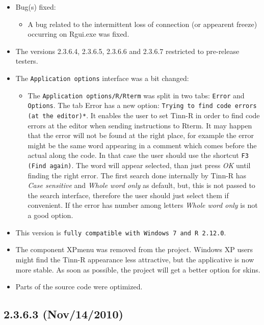 \begin{itemize}
  \item Bug(s) fixed:
    \begin{itemize}
      \item A bug related to the intermittent loss of connection (or appearent freeze) occurring on Rgui.exe was fixed.
    \end{itemize}
  \item The versions 2.3.6.4, 2.3.6.5, 2.3.6.6 and 2.3.6.7 restricted to pre-release testers.
  \item The \texttt{Application options} interface was a bit changed:
    \begin{itemize}
      \item The \texttt{Application options/R/Rterm} was split in two tabs: \texttt{Error} and \texttt{Options}.
        The tab Error has a new option: \texttt{Trying to find code errors (at the editor)*}.
        It enables the user to set Tinn-R in order to find code errors at the editor when sending instructions to Rterm.
        It may happen that the error will not be found at the right place, for example the error might be the same word appearing
        in a comment which comes before the actual along the code. In that case the user should use the shortcut \texttt{F3 (Find again)}.
        The word will appear selected, than just press \textit{OK} until finding the right error.
        The first search done internally by Tinn-R has \textit{Case sensitive} and \textit{Whole word only} as default, but,
        this is not passed to the search interface, therefore the user should just select them if convenient.
        If the error has number among letters \textit{Whole word only} is not a good option.
    \end{itemize}
  \item This version is \texttt{fully compatible with Windows 7 and R 2.12.0}.
  \item The component XPmenu was removed from the project. Windows XP users might find the Tinn-R appearance less attractive,
    but the applicative is now more stable. As soon as possible, the project will get a better option for skins.
  \item Parts of the source code were optimized.
\end{itemize}

\subsection{2.3.6.3 (Nov/14/2010)}

